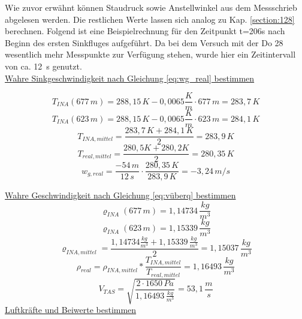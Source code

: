 \noindent Wie zuvor erwähnt können Staudruck sowie Anstellwinkel aus dem Messschrieb abgelesen werden. Die restlichen Werte lassen sich analog zu Kap. \ref{section:128} berechnen. Folgend ist eine Beispielrechnung für den Zeitpunkt t=206s nach Beginn des ersten Sinkfluges aufgeführt. Da bei dem Versuch mit der Do 28 wesentlich mehr Messpunkte zur Verfügung stehen, wurde hier ein Zeitintervall von ca. 12~s genutzt. \\

\noindent 
\underline{Wahre Sinkgeschwindigkeit nach Gleichung \ref{eq:wg_real} bestimmen}

\begin{equation*}
T_{INA}(677\,m) = 288,15\,K - 0,0065 \frac{K}{m} \cdot 677\,m = 283,7\,K
\end{equation*}
\begin{equation*}
T_{INA}(623\,m) = 288,15\,K - 0,0065 \frac{K}{m} \cdot 623\,m = 284,1\,K
\end{equation*}
\begin{equation*}
T_{INA,mittel} = \frac{283,7\,K + 284,1\,K}{2} = 283,9\,K
\end{equation*}
\begin{equation*}
T_{real,mittel} = \frac{280,5 K + 280,2 K}{2} =	280,35\,K
\end{equation*}
\begin{equation*}
w_{g,real} = \frac{-54\,m}{12\,s} \cdot \frac{280,35\,K}{283,9\,K} = - 3,24\,m/s
\end{equation*}

\vspace{5mm}


\noindent
\underline{Wahre Geschwindigkeit nach Gleichung \ref{eq:vüberq} bestimmen}
\begin{equation*}
\varrho_{INA}(677\,m) = 1,14734\,\frac{kg}{m^3}
\end{equation*}
\begin{equation*}
\varrho_{INA}(623\,m) = 1,15339\,\frac{kg}{m^3}
\end{equation*}
\begin{equation*}
\varrho_{INA,mittel} = \frac{1,14734\frac{kg}{m^3} + 1,15339\,\frac{kg}{m^3}}{2} = 1,15037\,\frac{kg}{m^3}
\end{equation*}
\begin{equation*}
\rho_{real} = \rho_{INA,mittel} * \frac{T_{INA,mittel}}{T_{real,mittel}} = 1,16493\,\frac{kg}{m^3}
\end{equation*}
\vspace{5mm}
\begin{equation*}
V_{TAS} = \sqrt{\frac{2 \cdot 1650\,Pa}{1,16493\,\frac{kg}{m^3}}} = 53,1 \,\frac{m}{s}
\end{equation*}
\newpage 
\noindent
\underline{Luftkräfte und Beiwerte bestimmen}

